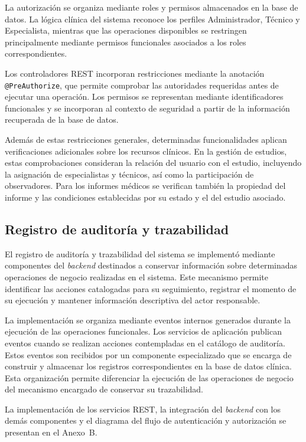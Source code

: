 La autorización se organiza mediante roles y permisos
almacenados en la base de datos. La lógica clínica del
sistema reconoce los perfiles Administrador, Técnico
y Especialista, mientras que las operaciones disponibles
se restringen principalmente mediante permisos
funcionales asociados a los roles correspondientes.

Los controladores REST incorporan restricciones mediante
la anotación \texttt{@PreAuthorize}, que permite comprobar
las autoridades requeridas antes de ejecutar una operación.
Los permisos se representan mediante identificadores
funcionales y se incorporan al contexto de seguridad
a partir de la información recuperada de la base de datos.

Además de estas restricciones generales, determinadas
funcionalidades aplican verificaciones adicionales sobre
los recursos clínicos. En la gestión de estudios, estas
comprobaciones consideran la relación del usuario con
el estudio, incluyendo la asignación de especialistas
y técnicos, así como la participación de observadores.
Para los informes médicos se verifican también la
propiedad del informe y las condiciones establecidas
por su estado y el del estudio asociado.

\subsection{Registro de auditoría y trazabilidad}

El registro de auditoría y trazabilidad del sistema se implementó mediante componentes del \textit{backend} destinados a conservar información sobre determinadas operaciones de negocio realizadas en el sistema. Este mecanismo permite identificar las acciones catalogadas para su seguimiento, registrar el momento de su ejecución y mantener información descriptiva del actor responsable.

La implementación se organiza mediante eventos internos generados durante la ejecución de las operaciones funcionales. Los servicios de aplicación publican eventos cuando se realizan acciones contempladas en el catálogo de auditoría. Estos eventos son recibidos por un componente especializado que se encarga de construir y almacenar los registros correspondientes en la base de datos clínica. Esta organización permite diferenciar la ejecución de las operaciones de negocio del mecanismo encargado de conservar su trazabilidad.

\begin{nuevotexto}
La implementación de los servicios REST, la integración del \textit{backend} con los demás componentes y el diagrama del flujo de autenticación y autorización se presentan en el Anexo~B.
\end{nuevotexto}

